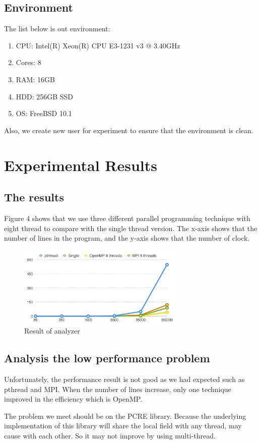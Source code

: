\documentclass{acm_proc_article-sp}
\begin{document}
\subsection{Environment}
	The list below is out environment:
	\begin{enumerate}
		\item CPU: Intel(R) Xeon(R) CPU E3-1231 v3 @ 3.40GHz
		\item Cores: 8
		\item RAM: 16GB
		\item HDD: 256GB SSD
		\item OS: FreeBSD 10.1
	\end{enumerate}
	Also, we create new user for experiment to ensure that the environment is clean.

\section{Experimental Results}
\subsection{The results}
Figure 4 shows that we use three different parallel programming technique with eight thread to compare with the single thread version. The x-axis shows that the number of lines in the program, and the y-axis shows that the number of clock.

\begin{figure}
	\centering
	\includegraphics[width=8cm]{result.png}
	\caption{Result of analyzer}
\end{figure}



\subsection{Analysis the low performance problem}
Unfortunately, the performance result is not good as we had expected such as pthread and MPI. When the number of lines increase, only one technique improved in the efficiency which is OpenMP.

The problem we meet should be on the PCRE library. Because the underlying implementation of this library will share the local field with any thread, may cause with each other. So it may not improve by using multi-thread.
\end{document}
